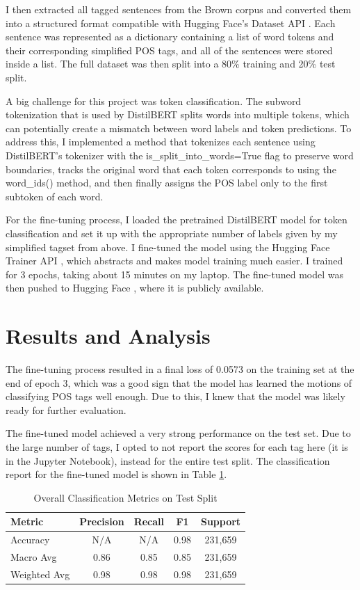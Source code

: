 \documentclass[10pt,twocolumn,letterpaper]{article}
\begin{document}
I then extracted all tagged sentences from the Brown corpus and converted them into a structured format compatible with Hugging Face's Dataset API \cite{huggingface_datasets}. Each sentence was represented as a dictionary containing a list of word tokens and their corresponding simplified POS tags, and all of the sentences were stored inside a list. The full dataset was then split into a 80\% training and 20\% test split.

A big challenge for this project was token classification. The subword tokenization that is used by DistilBERT splits words into multiple tokens, which can potentially create a mismatch between word labels and token predictions. To address this, I implemented a method that tokenizes each sentence using DistilBERT's tokenizer with the is\_split\_into\_words=True flag to preserve word boundaries, tracks the original word that each token corresponds to using the word\_ids() method, and then finally assigns the POS label only to the first subtoken of each word.

For the fine-tuning process, I loaded the pretrained DistilBERT model for token classification \cite{huggingface_distilbert} and set it up with the appropriate number of labels given by my simplified tagset from above. I fine-tuned the model using the Hugging Face Trainer API \cite{huggingface_trainer}, which abstracts and makes model training much easier. I trained for 3 epochs, taking about 15 minutes on my laptop. The fine-tuned model was then pushed to Hugging Face \cite{distilbert_brown_pos}, where it is publicly available.

\section{Results and Analysis}

The fine-tuning process resulted in a final loss of 0.0573 on the training set at the end of epoch 3, which was a good sign that the model has learned the motions of classifying POS tags well enough. Due to this, I knew that the model was likely ready for further evaluation.

The fine-tuned model achieved a very strong performance on the test set. Due to the large number of tags, I opted to not report the scores for each tag here (it is in the Jupyter Notebook), instead for the entire test split. The classification report for the fine-tuned model is shown in Table \ref{tab:classification_report_overall}.

\begin{table}[!ht]
\centering
\caption{Overall Classification Metrics on Test Split}
\label{tab:classification_report_overall}
\begin{tabular}{|l|c|c|c|c|}
\hline
\textbf{Metric} & \textbf{Precision} & \textbf{Recall} & \textbf{F1} & \textbf{Support} \\
\hline
Accuracy & N/A & N/A & 0.98 & 231,659 \\
Macro Avg & 0.86 & 0.85 & 0.85 & 231,659 \\
Weighted Avg & 0.98 & 0.98 & 0.98 & 231,659 \\
\hline
\end{tabular}
\end{table}
\end{document}
